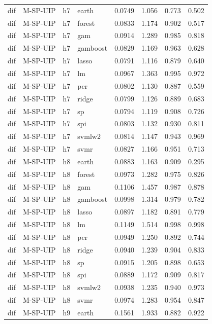 \begin{ThreePartTable}
\begin{longtable}[t]{llclcccc}
\addlinespace
dif & M-SP-UIP & h7 & earth & 0.0749 & 1.056 & 0.773 & 0.502\\
dif & M-SP-UIP & h7 & forest & 0.0833 & 1.174 & 0.902 & 0.517\\
dif & M-SP-UIP & h7 & gam & 0.0914 & 1.289 & 0.985 & 0.818\\
dif & M-SP-UIP & h7 & gamboost & 0.0829 & 1.169 & 0.963 & 0.628\\
dif & M-SP-UIP & h7 & lasso & 0.0791 & 1.116 & 0.879 & 0.640\\
dif & M-SP-UIP & h7 & lm & 0.0967 & 1.363 & 0.995 & 0.972\\
dif & M-SP-UIP & h7 & pcr & 0.0802 & 1.130 & 0.887 & 0.559\\
dif & M-SP-UIP & h7 & ridge & 0.0799 & 1.126 & 0.889 & 0.683\\
dif & M-SP-UIP & h7 & sp & 0.0794 & 1.119 & 0.908 & 0.726\\
dif & M-SP-UIP & h7 & spi & 0.0803 & 1.132 & 0.930 & 0.811\\
dif & M-SP-UIP & h7 & svmlw2 & 0.0814 & 1.147 & 0.943 & 0.969\\
dif & M-SP-UIP & h7 & svmr & 0.0827 & 1.166 & 0.951 & 0.713\\
\addlinespace
dif & M-SP-UIP & h8 & earth & 0.0883 & 1.163 & 0.909 & 0.295\\
dif & M-SP-UIP & h8 & forest & 0.0973 & 1.282 & 0.975 & 0.826\\
dif & M-SP-UIP & h8 & gam & 0.1106 & 1.457 & 0.987 & 0.878\\
dif & M-SP-UIP & h8 & gamboost & 0.0998 & 1.314 & 0.979 & 0.782\\
dif & M-SP-UIP & h8 & lasso & 0.0897 & 1.182 & 0.891 & 0.779\\
dif & M-SP-UIP & h8 & lm & 0.1149 & 1.514 & 0.998 & 0.998\\
dif & M-SP-UIP & h8 & pcr & 0.0949 & 1.250 & 0.892 & 0.744\\
dif & M-SP-UIP & h8 & ridge & 0.0940 & 1.239 & 0.904 & 0.833\\
dif & M-SP-UIP & h8 & sp & 0.0915 & 1.205 & 0.898 & 0.653\\
dif & M-SP-UIP & h8 & spi & 0.0889 & 1.172 & 0.909 & 0.817\\
dif & M-SP-UIP & h8 & svmlw2 & 0.0938 & 1.235 & 0.940 & 0.973\\
dif & M-SP-UIP & h8 & svmr & 0.0974 & 1.283 & 0.954 & 0.847\\
\addlinespace
dif & M-SP-UIP & h9 & earth & 0.1561 & 1.933 & 0.882 & 0.922\\

\end{longtable}
\end{ThreePartTable}

